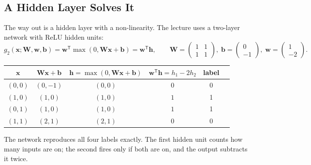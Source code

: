 \documentclass[11pt, oneside]{book}
\newcommand{\T}{^{\mathsf{T}}}           %
\newcommand{\bx}{\bm{x}}        \newcommand{\by}{\bm{y}}
\newcommand{\bw}{\bm{w}}        \newcommand{\bW}{\bm{W}}
\newcommand{\bb}{\bm{b}}        \newcommand{\bh}{\bm{h}}
\let\originalsubsection\subsection
\renewcommand{\subsection}{\Needspace{6\baselineskip}\originalsubsection}
\begin{document}
\subsection{A Hidden Layer Solves It}

The way out is a hidden layer with a non-linearity. The lecture uses a
two-layer network with ReLU hidden units:
\[
  g_2(\bx; \bW, \bw, \bb) = \bw\T\max(0, \bW\bx + \bb) = \bw\T\bh,
  \qquad
  \bW = \begin{pmatrix} 1 & 1 \\ 1 & 1 \end{pmatrix}, \;
  \bb = \begin{pmatrix} 0 \\ -1 \end{pmatrix}, \;
  \bw = \begin{pmatrix} 1 \\ -2 \end{pmatrix}.
\]

\begin{exbox}[title={The XOR network, step by step}]
\centering
\begin{tabular}{@{}cccccc@{}}
\toprule
$\bx$ & $\bW\bx + \bb$ & $\bh = \max(0, \bW\bx + \bb)$ & $\bw\T\bh = h_1 - 2h_2$ & label \\
\midrule
$(0,0)$ & $(0, -1)$ & $(0, 0)$ & $0$ & 0 \\
$(1,0)$ & $(1, 0)$  & $(1, 0)$ & $1$ & 1 \\
$(0,1)$ & $(1, 0)$  & $(1, 0)$ & $1$ & 1 \\
$(1,1)$ & $(2, 1)$  & $(2, 1)$ & $0$ & 0 \\
\bottomrule
\end{tabular}

\raggedright
\smallskip
The network reproduces all four labels exactly. The first hidden unit
counts how many inputs are on; the second fires only if both are on, and
the output subtracts it twice.
\end{exbox}
\end{document}
